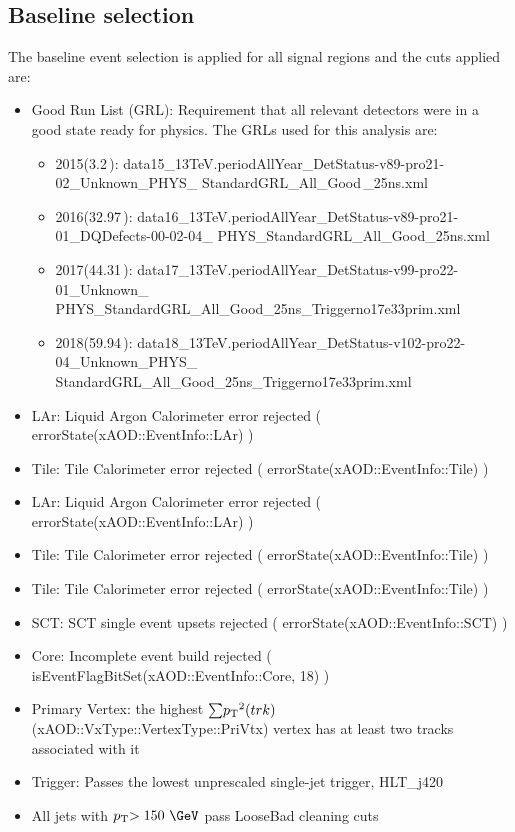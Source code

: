 \subsection{Baseline selection}
\label{sec:base_selection}
The baseline event selection is applied for all signal regions and
the cuts applied are:
\begin{itemize}
\item Good Run List (GRL): Requirement that all relevant detectors were in a good state ready for physics. The GRLs used for this analysis are:
	\begin{itemize}
		\item 2015(3.2\,\ifb): data15\_13TeV.periodAllYear\_DetStatus-v89-pro21-02\_Unknown\_PHYS\_ \newline StandardGRL\_All\_Good\,\_25ns.xml
		\item 2016(32.97\,\ifb): data16\_13TeV.periodAllYear\_DetStatus-v89-pro21-01\_DQDefects-00-02-04\_ \newline PHYS\_StandardGRL\_All\_Good\_25ns.xml
		\item 2017(44.31\,\ifb): data17\_13TeV.periodAllYear\_DetStatus-v99-pro22-01\_Unknown\_ \newline PHYS\_StandardGRL\_All\_Good\_25ns\_Triggerno17e33prim.xml
		\item 2018(59.94\,\ifb): data18\_13TeV.periodAllYear\_DetStatus-v102-pro22-04\_Unknown\_PHYS\_ \newline StandardGRL\_All\_Good\_25ns\_Triggerno17e33prim.xml
	\end{itemize}
\item LAr: Liquid Argon Calorimeter error rejected ( errorState(xAOD::EventInfo::LAr) )
\item Tile: Tile Calorimeter error rejected ( errorState(xAOD::EventInfo::Tile) )
\item LAr: Liquid Argon Calorimeter error rejected ( errorState(xAOD::EventInfo::LAr) )
\item Tile: Tile Calorimeter error rejected ( errorState(xAOD::EventInfo::Tile) )
\item Tile: Tile Calorimeter error rejected ( errorState(xAOD::EventInfo::Tile) )
\item SCT: SCT single event upsets rejected ( errorState(xAOD::EventInfo::SCT) )
\item Core: Incomplete event build rejected ( isEventFlagBitSet(xAOD::EventInfo::Core, 18) )
\item Primary Vertex: the highest $\sum\pt^{2}(trk)$ (xAOD::VxType::VertexType::PriVtx) vertex has at least two tracks associated with it
\item Trigger: Passes the lowest unprescaled single-jet trigger, HLT\_j420
\item All jets with $\pt>150~\GeV$ pass LooseBad cleaning cuts
\end{itemize}

